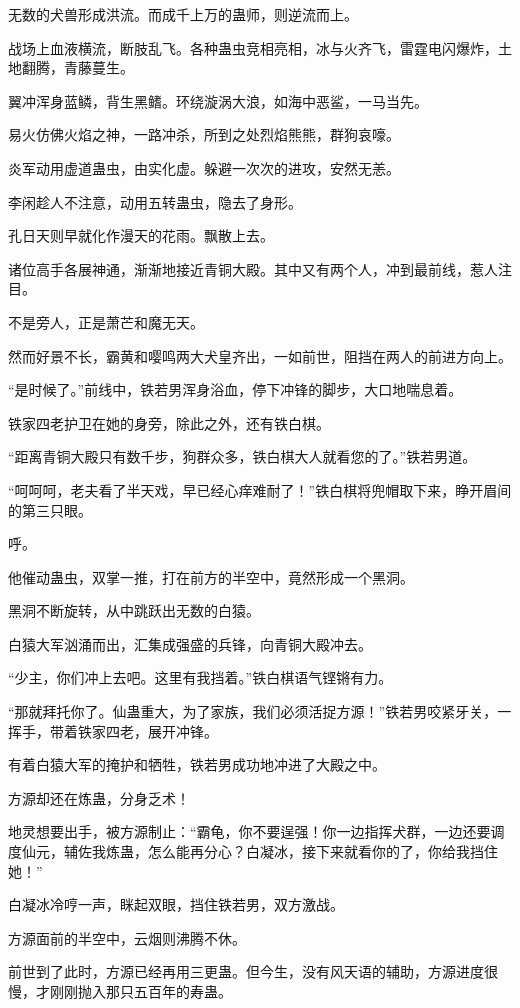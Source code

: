 \begin{this_body}
无数的犬兽形成洪流。而成千上万的蛊师，则逆流而上。

战场上血液横流，断肢乱飞。各种蛊虫竞相亮相，冰与火齐飞，雷霆电闪爆炸，土地翻腾，青藤蔓生。

翼冲浑身蓝鳞，背生黑鳍。环绕漩涡大浪，如海中恶鲨，一马当先。

易火仿佛火焰之神，一路冲杀，所到之处烈焰熊熊，群狗哀嚎。

炎军动用虚道蛊虫，由实化虚。躲避一次次的进攻，安然无恙。

李闲趁人不注意，动用五转蛊虫，隐去了身形。

孔日天则早就化作漫天的花雨。飘散上去。

诸位高手各展神通，渐渐地接近青铜大殿。其中又有两个人，冲到最前线，惹人注目。

不是旁人，正是萧芒和魔无天。

然而好景不长，霸黄和嘤鸣两大犬皇齐出，一如前世，阻挡在两人的前进方向上。

“是时候了。”前线中，铁若男浑身浴血，停下冲锋的脚步，大口地喘息着。

铁家四老护卫在她的身旁，除此之外，还有铁白棋。

“距离青铜大殿只有数千步，狗群众多，铁白棋大人就看您的了。”铁若男道。

“呵呵呵，老夫看了半天戏，早已经心痒难耐了！”铁白棋将兜帽取下来，睁开眉间的第三只眼。

呼。

他催动蛊虫，双掌一推，打在前方的半空中，竟然形成一个黑洞。

黑洞不断旋转，从中跳跃出无数的白猿。

白猿大军汹涌而出，汇集成强盛的兵锋，向青铜大殿冲去。

“少主，你们冲上去吧。这里有我挡着。”铁白棋语气铿锵有力。

“那就拜托你了。仙蛊重大，为了家族，我们必须活捉方源！”铁若男咬紧牙关，一挥手，带着铁家四老，展开冲锋。

有着白猿大军的掩护和牺牲，铁若男成功地冲进了大殿之中。

方源却还在炼蛊，分身乏术！

地灵想要出手，被方源制止：“霸龟，你不要逞强！你一边指挥犬群，一边还要调度仙元，辅佐我炼蛊，怎么能再分心？白凝冰，接下来就看你的了，你给我挡住她！”

白凝冰冷哼一声，眯起双眼，挡住铁若男，双方激战。

方源面前的半空中，云烟则沸腾不休。

前世到了此时，方源已经再用三更蛊。但今生，没有风天语的辅助，方源进度很慢，才刚刚抛入那只五百年的寿蛊。


\end{this_body}
